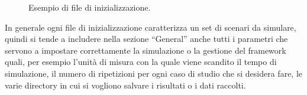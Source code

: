 \begin{figure}[t]
	\hfill
	\caption[Esempio di INI file]{Esempio di file di inizializzazione.}
	\label{fig:ini_file}
\end{figure}

In generale ogni file di inizializzazione caratterizza un set di scenari da simulare, quindi si tende a includere nella sezione “General” anche tutti i parametri che servono a impostare correttamente la simulazione o la gestione del framework quali, per esempio l'unità di misura con la quale viene scandito il tempo di simulazione, il numero di ripetizioni per ogni caso di studio che si desidera fare, le varie directory in cui si vogliono salvare i risultati o i dati raccolti.

